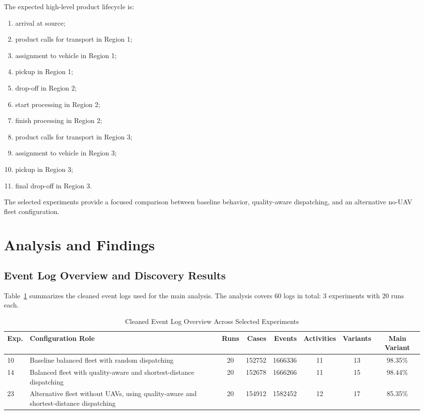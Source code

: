 \documentclass[conference]{IEEEtran}
\begin{document}
The expected high-level product lifecycle is:

\begin{enumerate}
\item arrival at source;
\item product calls for transport in Region 1;
\item assignment to vehicle in Region 1;
\item pickup in Region 1;
\item drop-off in Region 2;
\item start processing in Region 2;
\item finish processing in Region 2;
\item product calls for transport in Region 3;
\item assignment to vehicle in Region 3;
\item pickup in Region 3;
\item final drop-off in Region 3.
\end{enumerate}

The selected experiments provide a focused comparison between baseline behavior, quality-aware dispatching, and an alternative no-UAV fleet configuration.

\section{Analysis and Findings}

\subsection{Event Log Overview and Discovery Results}

Table~\ref{tab:log-overview} summarizes the cleaned event logs used for the main analysis. The analysis covers 60 logs in total: 3 experiments with 20 runs each.

\begin{table}[t]
\caption{Cleaned Event Log Overview Across Selected Experiments}
\label{tab:log-overview}
\centering
\begin{tabular}{|l|p{4.2cm}|c|r|r|c|c|c|}
\hline
\textbf{Exp.} & \textbf{Configuration Role} & \textbf{Runs} & \textbf{Cases} & \textbf{Events} & \textbf{Activities} & \textbf{Variants} & \textbf{Main Variant} \\
\hline
10 & Baseline balanced fleet with random dispatching & 20 & 152752 & 1666336 & 11 & 13 & 98.35\% \\
\hline
14 & Balanced fleet with quality-aware and shortest-distance dispatching & 20 & 152678 & 1666266 & 11 & 15 & 98.44\% \\
\hline
23 & Alternative fleet without UAVs, using quality-aware and shortest-distance dispatching & 20 & 154912 & 1582452 & 12 & 17 & 85.35\% \\
\hline
\end{tabular}
\end{table}
\end{document}
